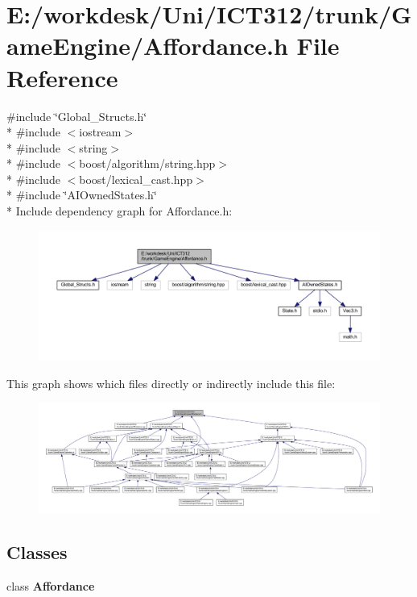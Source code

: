 \section{E\+:/workdesk/\+Uni/\+I\+C\+T312/trunk/\+Game\+Engine/\+Affordance.h File Reference}
\label{_affordance_8h}
{\ttfamily \#include \char`\"{}Global\+\_\+\+Structs.\+h\char`\"{}}\\*
{\ttfamily \#include $<$iostream$>$}\\*
{\ttfamily \#include $<$string$>$}\\*
{\ttfamily \#include $<$boost/algorithm/string.\+hpp$>$}\\*
{\ttfamily \#include $<$boost/lexical\+\_\+cast.\+hpp$>$}\\*
{\ttfamily \#include \char`\"{}A\+I\+Owned\+States.\+h\char`\"{}}\\*
Include dependency graph for Affordance.\+h\+:\nopagebreak
\begin{figure}[H]
\begin{center}
\leavevmode
\includegraphics[width=350pt]{dd/d28/_affordance_8h__incl}
\end{center}
\end{figure}
This graph shows which files directly or indirectly include this file\+:
\nopagebreak
\begin{figure}[H]
\begin{center}
\leavevmode
\includegraphics[width=350pt]{dd/d75/_affordance_8h__dep__incl}
\end{center}
\end{figure}
\subsection*{Classes}
\begin{DoxyCompactItemize}
\item 
class {\bf Affordance}
\end{DoxyCompactItemize}
